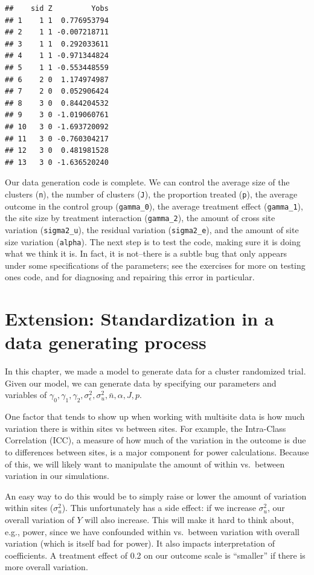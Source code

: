 \documentclass[
]{book}
\begin{document}
\begin{verbatim}
##    sid Z         Yobs
## 1    1 1  0.776953794
## 2    1 1 -0.007218711
## 3    1 1  0.292033611
## 4    1 1 -0.971344824
## 5    1 1 -0.553448559
## 6    2 0  1.174974987
## 7    2 0  0.052906424
## 8    3 0  0.844204532
## 9    3 0 -1.019060761
## 10   3 0 -1.693720092
## 11   3 0 -0.760304217
## 12   3 0  0.481981528
## 13   3 0 -1.636520240
\end{verbatim}

Our data generation code is complete.
We can control the average size of the clusters (\texttt{n}), the number of clusters (\texttt{J}), the proportion treated (\texttt{p}), the average outcome in the control group (\texttt{gamma\_0}), the average treatment effect (\texttt{gamma\_1}), the site size by treatment interaction (\texttt{gamma\_2}), the amount of cross site variation (\texttt{sigma2\_u}), the residual variation (\texttt{sigma2\_e}), and the amount of site size variation (\texttt{alpha}).
The next step is to test the code, making sure it is doing what we think it is.
In fact, it is not--there is a subtle bug that only appears under some specifications of the parameters; see the exercises for more on testing ones code, and for diagnosing and repairing this error in particular.

\section{Extension: Standardization in a data generating process}\label{extension-standardization-in-a-data-generating-process}

In this chapter, we made a model to generate data for a cluster randomized trial.
Given our model, we can generate data by specifying our parameters and variables of \(\gamma_{0}, \gamma_{1}, \gamma_{2}, \sigma^2_\epsilon, \sigma^2_u, \bar{n}, \alpha, J, p\).

One factor that tends to show up when working with multisite data is how much variation there is within sites vs between sites.
For example, the Intra-Class Correlation (ICC), a measure of how much of the variation in the outcome is due to differences between sites, is a major component for power calculations.
Because of this, we will likely want to manipulate the amount of within vs.~between variation in our simulations.

An easy way to do this would be to simply raise or lower the amount of variation within sites (\(\sigma^2_u\)).
This unfortunately has a side effect: if we increase \(\sigma^2_u\), our overall variation of \(Y\) will also increase.
This will make it hard to think about, e.g., power, since we have confounded within vs.~between variation with overall variation (which is itself bad for power).
It also impacts interpretation of coefficients.
A treatment effect of 0.2 on our outcome scale is ``smaller'' if there is more overall variation.
\end{document}
